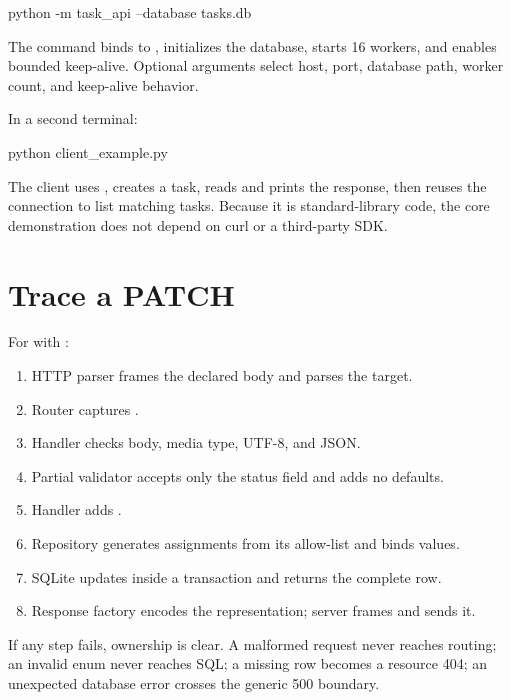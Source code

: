 \begin{wiremessage}
python -m task_api --database tasks.db
\end{wiremessage}

The command binds to , initializes the database, starts 16
workers, and enables bounded keep-alive. Optional arguments select host, port,
database path, worker count, and keep-alive behavior.

In a second terminal:

\begin{wiremessage}
python client_example.py
\end{wiremessage}

The client uses , creates a task, reads and prints the response,
then reuses the connection to list matching tasks. Because it is standard-library
code, the core demonstration does not depend on curl or a third-party SDK.


\section{Trace a PATCH}

For  with :

\begin{enumerate}
  \item HTTP parser frames the declared body and parses the target.
  \item Router captures .
  \item Handler checks body, media type, UTF-8, and JSON.
  \item Partial validator accepts only the status field and adds no defaults.
  \item Handler adds .
  \item Repository generates assignments from its allow-list and binds values.
  \item SQLite updates inside a transaction and returns the complete row.
  \item Response factory encodes the representation; server frames and sends it.
\end{enumerate}

If any step fails, ownership is clear. A malformed request never reaches routing;
an invalid enum never reaches SQL; a missing row becomes a resource 404; an
unexpected database error crosses the generic 500 boundary.

